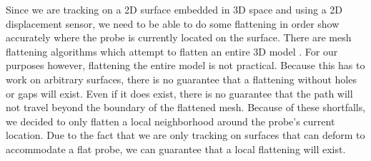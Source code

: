 Since we are tracking on a 2D surface embedded in 3D space and using a 2D displacement sensor, we need to be able to do some flattening in order show accurately where the probe is currently located on the surface. There are mesh flattening algorithms which attempt to flatten an entire 3D model \cite{meshunfolding}. For our purposes however, flattening the entire model is not practical. Because this has to work on arbitrary surfaces, there is no guarantee that a flattening without holes or gaps will exist. Even if it does exist, there is no guarantee that the path will not travel beyond the boundary of the flattened mesh. Because of these shortfalls, we decided to only flatten a local neighborhood around the probe's current location. Due to the fact that we are only tracking on surfaces that can deform to accommodate a flat probe, we can guarantee that a local flattening will exist.